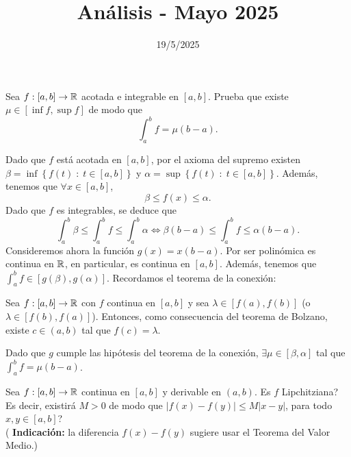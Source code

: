 \documentclass{article}
\begin{document}
\title{Análisis - Mayo 2025}
\date{19/5/2025}

\maketitle

\begin{ej}
	Sea $\displaystyle f : \left[a,b\right] \to \mathbb{R} $ acotada e integrable en $\displaystyle \left[a,b\right]  $. Prueba que existe $\displaystyle \mu \in \left[\inf f, \sup f\right]  $ de modo que 
	\[\int^{b}_{a} f = \mu\left(b-a\right) .\]
\end{ej}
\begin{sol}
	Dado que $\displaystyle f $ está acotada en $\displaystyle \left[a,b\right]  $, por el axioma del supremo existen $\displaystyle \beta = \inf \left\{ f\left(t\right) \; : \; t \in \left[a,b\right] \right\}  $ y $\displaystyle \alpha = \sup \left\{ f\left(t\right) \; : \; t \in \left[a,b\right] \right\}  $. Además, tenemos que $\displaystyle \forall x \in \left[a,b\right]  $,
	\[\beta \leq f\left(x\right) \leq \alpha  .\]
	Dado que $\displaystyle f $ es integrables, se deduce que 
	\[\int^{b}_{a} \beta  \leq \int^{b}_{a} f \leq \int^{b}_{a} \alpha \iff \beta\left(b-a\right) \leq \int^{b}_{a} f \leq \alpha\left(b-a\right) .\]
	Consideremos ahora la función $\displaystyle g\left(x\right) = x\left(b-a\right) $. Por ser polinómica es continua en $\displaystyle \mathbb{R} $, en particular, es continua en $\displaystyle \left[a,b\right]  $. Además, tenemos que $\displaystyle \int^{b}_{a} f \in \left[g\left(\beta \right), g\left(\alpha \right)\right]  $. Recordamos el teorema de la conexión:
\begin{theorem}
	Sea $\displaystyle f : \left[a,b\right] \to \mathbb{R} $ con $\displaystyle f $ continua en $\displaystyle \left[a,b\right]  $ y sea $\displaystyle \lambda \in \left[f\left(a\right), f\left(b\right)\right]  $ (o $\displaystyle \lambda \in \left[f\left(b\right), f\left(a\right)\right]  $). Entonces, como consecuencia del teorema de Bolzano, existe $\displaystyle c \in \left(a,b\right) $ tal que $\displaystyle f\left(c\right) = \lambda  $.
\end{theorem}
Dado que $\displaystyle g $ cumple las hipótesis del teorema de la conexión, $\displaystyle \exists \mu \in \left[\beta, \alpha \right]  $ tal que $\displaystyle \int^{b}_{a} f = \mu\left(b-a\right) $.
\end{sol}
\begin{ej}
	Sea $\displaystyle f : \left[a,b\right] \to \mathbb{R} $ continua en $\displaystyle \left[a,b\right]  $ y derivable en $\displaystyle \left(a,b\right) $. Es $\displaystyle f $ Lipchitziana? Es decir, existirá $\displaystyle M > 0 $ de modo que $\displaystyle \left|f\left(x\right) - f\left(y\right)\right| \leq M \left|x-y\right| $, para todo $\displaystyle x,y \in \left[a,b\right]  $? \\
	( \textbf{Indicación:} la diferencia $\displaystyle f\left(x\right)-f\left(y\right) $ sugiere usar el Teorema del Valor Medio.)
\end{ej}
\end{document}
